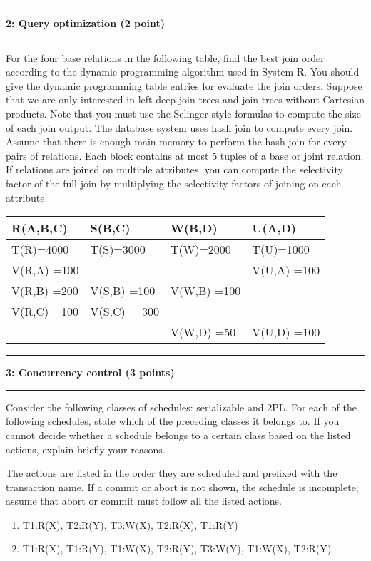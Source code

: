 \documentclass[11pt]{article}
\newcommand\question[2]{\vspace{.25in}\hrule\textbf{#1: #2}\vspace{.5em}\hrule\vspace{.10in}}
\begin{document}
\question{2}{Query optimization  (2 point)}
For the four base relations in the following table,
find the best join order according to
the dynamic programming algorithm used in System-R.
You should give the dynamic programming table entries
for evaluate the join orders.
Suppose that we are only interested in left-deep join trees and
join trees without Cartesian products.
Note that you must use the Selinger-style formulas to compute the size of each join output.
The database system uses hash join to compute every join.
Assume that there is enough main memory to perform the hash join for every pairs of relations.
Each block contains at most 5 tuples of a base or joint relation.
If relations are joined on multiple attributes, you can compute the selectivity factor of the full join by multiplying the
selectivity factors of joining on each attribute.


\begin{tabular}{ |l| l | l|l|}
\hline
  R(A,B,C) & S(B,C) & W(B,D) & U(A,D) \\\hline
  T(R)=4000 & T(S)=3000& T(W)=2000 & T(U)=1000 \\\hline
  V(R,A) =100 &  & & V(U,A) =100\\
  V(R,B) =200 & V(S,B) =100& V(W,B) =100& \\
  V(R,C) =100 & V(S,C) = 300&&\\
  & & V(W,D) =50 & V(U,D) =100\\\hline
\end{tabular}





\question{3}{Concurrency control (3 points)}
Consider the following classes of schedules: serializable and 2PL.
For each of the following schedules, state which of the preceding classes it belongs to.
If you cannot decide whether a schedule belongs to a certain class based on the listed actions, explain briefly your reasons.

The actions are listed in the order they are scheduled and prefixed with the transaction name.
If a commit or abort is not shown, the schedule is incomplete; assume that abort or commit must follow all the listed actions.


\begin{enumerate}
\item T1:R(X), T2:R(Y), T3:W(X), T2:R(X), T1:R(Y)
\item T1:R(X), T1:R(Y), T1:W(X), T2:R(Y), T3:W(Y), T1:W(X), T2:R(Y)
\end{enumerate}
\end{document}
